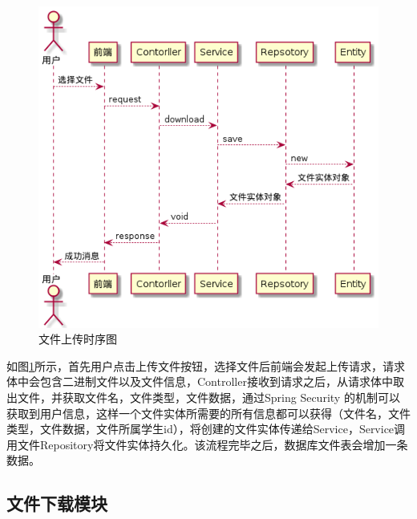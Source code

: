 \begin{figure}[H]
    \centering
    \includegraphics[scale = 0.6]{out/uml/时序图/file-upload-sequence/file-upload-sequence.png}
    \caption{\song\wuhao 文件上传时序图}
    \label{file-upload-sequence}
\end{figure}

如图\ref{file-upload-sequence}所示，首先用户点击上传文件按钮，选择文件后前端会发起上传请求，请求体中会包含二进制文件以及文件信息，Controller接收到请求之后，从请求体中取出文件，并获取文件名，文件类型，文件数据，通过Spring Security 的机制可以获取到用户信息，这样一个文件实体所需要的所有信息都可以获得（文件名，文件类型，文件数据，文件所属学生id），将创建的文件实体传递给Service，Service调用文件Repository将文件实体持久化。该流程完毕之后，数据库文件表会增加一条数据。

\subsection{文件下载模块}

